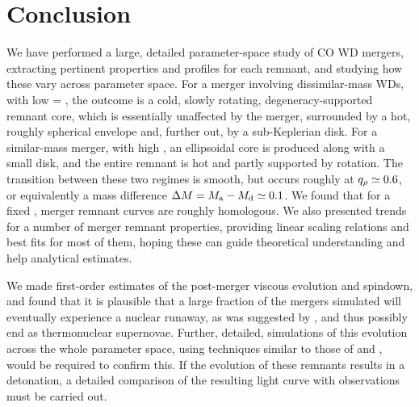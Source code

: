 
\section{Conclusion}

We have performed a large, detailed parameter-space study of CO WD mergers, extracting pertinent properties and profiles for each remnant, and studying how these vary across parameter space.  For a merger involving dissimilar-mass WDs, with low {\qrho} = {\rhocrat}, the outcome is a cold, slowly rotating, degeneracy-supported remnant core, which is essentially unaffected by the merger, surrounded by a hot, roughly spherical envelope and, further out, by a sub-Keplerian disk.  For a similar-mass merger, with high {\qrho}, an ellipsoidal core is produced along with a small disk, and the entire remnant is hot and partly supported by rotation.  The transition between these two regimes is smooth, but occurs roughly at $\qrho\simeq0.6$, or equivalently a mass difference $\Delta M= \Ma-\Md \simeq 0.1$.  We found that for a fixed {\qrho}, merger remnant curves are roughly homologous.  We also presented trends for a number of merger remnant properties, providing linear scaling relations and best fits for most of them, hoping these can guide theoretical understanding and help analytical estimates.

We made first-order estimates of the post-merger viscous evolution and spindown, and found that it is plausible that a large fraction of the mergers simulated will eventually experience a nuclear runaway, as was suggested by \citeal{vkercj10}, and thus possibly end as thermonuclear supernovae.  Further, detailed, simulations of this evolution across the whole parameter space, using techniques similar to those of \citet{shen+12} and \citet{schw+12}, would be required to confirm this.  If the evolution of these remnants results in a detonation, a detailed comparison of the resulting light curve with observations must be carried out.

